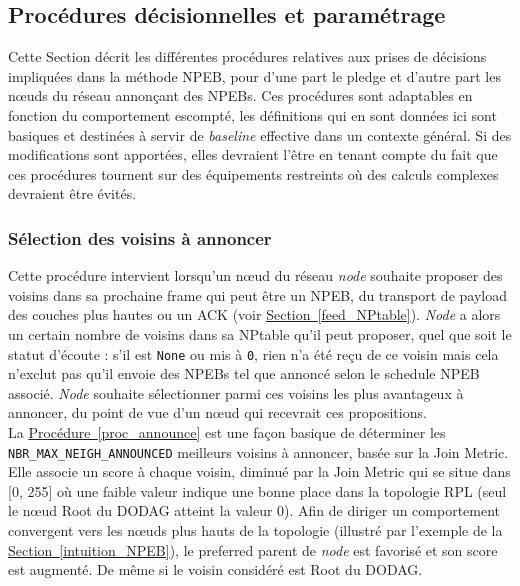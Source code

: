 \documentclass[]{report}
\newcommand{\wordlink}[2]{\hyperref[#2]{#1~\ref{#2}}}
\begin{document}
\subsection{Procédures décisionnelles et paramétrage}
\label{decisional}

Cette Section décrit les différentes procédures relatives aux prises de décisions impliquées dans la méthode NPEB, pour d'une part le pledge et d'autre part les nœuds du réseau annonçant des NPEBs. Ces procédures sont adaptables en fonction du comportement escompté, les définitions qui en sont données ici sont basiques et destinées à servir de \textit{baseline} effective dans un contexte général. Si des modifications sont apportées, elles devraient l'être en tenant compte du fait que ces procédures tournent sur des équipements restreints où des calculs complexes devraient être évités.

\subsubsection{Sélection des voisins à annoncer}

Cette procédure intervient lorsqu'un nœud du réseau \textit{node} souhaite proposer des voisins dans sa prochaine frame qui peut être un NPEB, du transport de payload des couches plus hautes ou un ACK (voir \wordlink{Section}{feed_NPtable}). \textit{Node} a alors un certain nombre de voisins dans sa NPtable qu'il peut proposer, quel que soit le statut d'écoute : s'il est \texttt{None} ou mis à \texttt{0}, rien n'a été reçu de ce voisin mais cela n'exclut pas qu'il envoie des NPEBs tel que annoncé selon le schedule NPEB associé. \textit{Node} souhaite sélectionner parmi ces voisins les plus avantageux à annoncer, du point de vue d'un nœud qui recevrait ces propositions.\\

La \wordlink{Procédure}{proc_announce} est une façon basique de déterminer les \texttt{NBR\_MAX\_NEIGH\_ANNOUNCED} meilleurs voisins à annoncer, basée sur la Join Metric. Elle associe un score à chaque voisin, diminué par la Join Metric qui se situe dans [0, 255] où une faible valeur indique une bonne place dans la topologie RPL (seul le nœud Root du DODAG atteint la valeur 0). Afin de diriger un comportement convergent vers les nœuds plus hauts de la topologie (illustré par l'exemple de la \wordlink{Section}{intuition_NPEB}), le preferred parent de \textit{node} est favorisé et son score est augmenté. De même si le voisin considéré est Root du DODAG.\\
\end{document}
